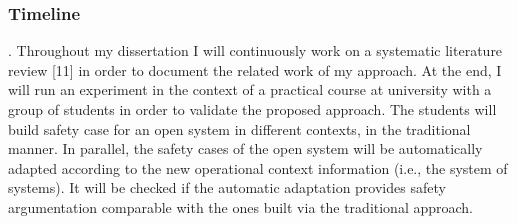 \subsubsection {Timeline}

. Throughout my dissertation I will
continuously work on a systematic literature review [11]
in order to document the related work of my approach.
At the end, I will run an experiment in the context of a
practical course at university with a group of students in
order to validate the proposed approach. The students will
build safety case for an open system in different contexts,
in the traditional manner. In parallel, the safety cases of
the open system will be automatically adapted according
to the new operational context information (i.e., the system
of systems). It will be checked if the automatic adaptation
provides safety argumentation comparable with the ones
built via the traditional approach.